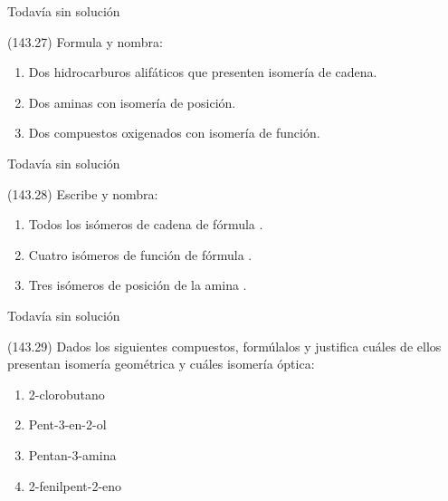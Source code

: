 \documentclass[10pt,a5paper,twoside]{article}
\begin{document}
  \begin{solution}[print=false]
    Todavía sin solución
  \end{solution}




  \begin{exercise}[
      tags    = {},
      topics  = {química, química orgánica, orgánica},
      source  = {FQ 1B MGH 2016, p143, e27},
    ]
    (143.27) Formula y nombra:
    \begin{enumerate}
      \item Dos hidrocarburos alifáticos que presenten isomería de cadena.
      \item Dos aminas con isomería de posición.
      \item Dos compuestos oxigenados con isomería de función.
    \end{enumerate}
  \end{exercise}

  \begin{solution}[print=false]
    Todavía sin solución
  \end{solution}




  \begin{exercise}[
      tags    = {},
      topics  = {química, química orgánica, orgánica},
      source  = {FQ 1B MGH 2016, p143, e28},
    ]
    (143.28) Escribe y nombra:
    \begin{enumerate}
      \item Todos los isómeros de cadena de fórmula .
      \item Cuatro isómeros de función de fórmula .
      \item Tres isómeros de posición de la amina .
    \end{enumerate}
  \end{exercise}

  \begin{solution}[print=false]
    Todavía sin solución
  \end{solution}




  \begin{exercise}[
      tags    = {},
      topics  = {química, química orgánica, orgánica},
      source  = {FQ 1B MGH 2016, p143, e29},
    ]
    (143.29) Dados los siguientes compuestos, formúlalos y justifica cuáles
    de ellos presentan isomería geométrica y cuáles isomería
    óptica:
    \begin{enumerate}
      \item 2-clorobutano
      \item Pent-3-en-2-ol
      \item Pentan-3-amina
      \item 2-fenilpent-2-eno
    \end{enumerate}
  \end{exercise}
\end{document}
